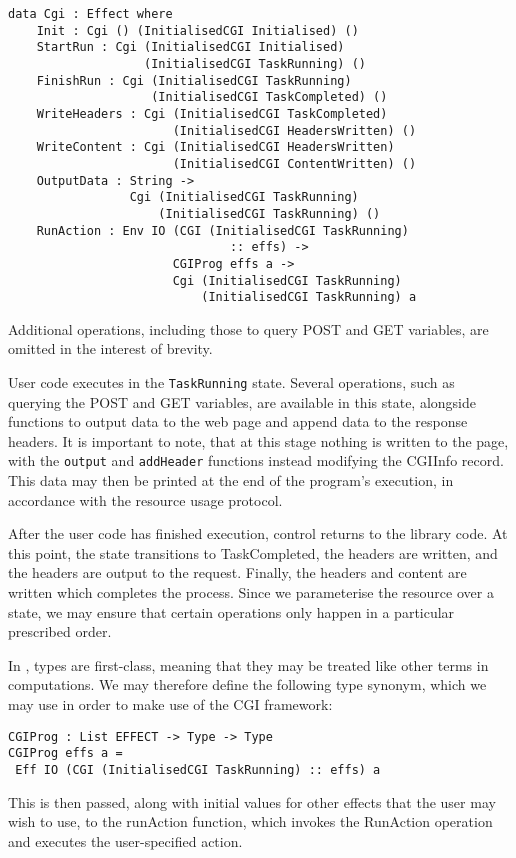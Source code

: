 \documentclass[preprint]{sigplanconf}
\begin{document}
\begin{Verbatim}
data Cgi : Effect where
    Init : Cgi () (InitialisedCGI Initialised) ()
    StartRun : Cgi (InitialisedCGI Initialised) 
                   (InitialisedCGI TaskRunning) ()
    FinishRun : Cgi (InitialisedCGI TaskRunning) 
                    (InitialisedCGI TaskCompleted) ()
    WriteHeaders : Cgi (InitialisedCGI TaskCompleted) 
                       (InitialisedCGI HeadersWritten) ()
    WriteContent : Cgi (InitialisedCGI HeadersWritten) 
                       (InitialisedCGI ContentWritten) ()
    OutputData : String -> 
                 Cgi (InitialisedCGI TaskRunning) 
                     (InitialisedCGI TaskRunning) ()
    RunAction : Env IO (CGI (InitialisedCGI TaskRunning) 
                               :: effs) -> 
                       CGIProg effs a -> 
                       Cgi (InitialisedCGI TaskRunning) 
                           (InitialisedCGI TaskRunning) a
\end{Verbatim}
Additional operations, including those to query POST and GET variables, are omitted in the interest of brevity.

User code executes in the \texttt{TaskRunning} state. Several operations, such as querying the POST and GET variables, are available in this state, alongside functions to output data to the web page and append data to the response headers. It is important to note, that at this stage nothing is written to the page, with the \texttt{output} and \texttt{addHeader} functions instead modifying the CGIInfo record. This data may then be printed at the end of the program's execution, in accordance with the resource usage protocol.

After the user code has finished execution, control returns to the library code. At this point, the state transitions to TaskCompleted, the headers are written, and the headers are output to the request. Finally, the headers and content are written which completes the process. Since we parameterise the resource over a state, we may ensure that certain operations only happen in a particular prescribed order.

In \idris{}, types are first-class, meaning that they may be treated like other terms in computations. We may therefore define the following type synonym, which we may use in order to make use of the CGI framework: 
\begin{Verbatim}
CGIProg : List EFFECT -> Type -> Type
CGIProg effs a = 
 Eff IO (CGI (InitialisedCGI TaskRunning) :: effs) a
\end{Verbatim}
This is then passed, along with initial values for other effects that the user may wish to use, to the runAction function, which invokes the RunAction operation and executes the user-specified action.
\end{document}
